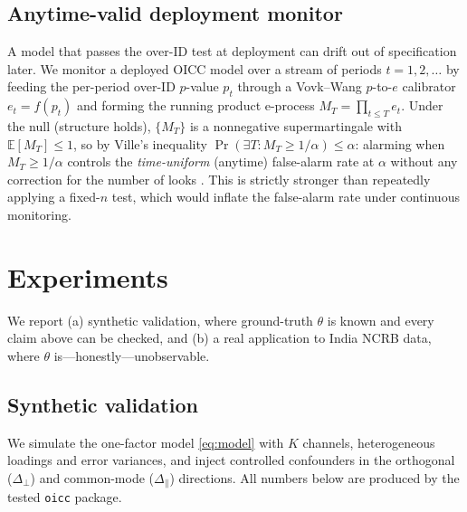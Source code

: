 \documentclass[11pt]{article}
\theoremstyle{definition}
\theoremstyle{remark}
\newcommand{\E}{\mathbb{E}}
\newcommand{\dperp}{\Delta_{\perp}}
\newcommand{\dpar}{\Delta_{\parallel}}
\begin{document}
\subsection{Anytime-valid deployment monitor}\label{sec:monitor}

A model that passes the over-ID test at deployment can drift out of
specification later. We monitor a deployed OICC model over a stream of periods
$t=1,2,\dots$ by feeding the per-period over-ID $p$-value $p_t$ through a
Vovk--Wang $p$-to-$e$ calibrator $e_t = f(p_t)$ and forming the running product
e-process $M_T = \prod_{t\le T} e_t$. Under the null (structure holds), $\{M_T\}$
is a nonnegative supermartingale with $\E[M_T]\le 1$, so by Ville's inequality
$\Pr(\exists T: M_T \ge 1/\alpha) \le \alpha$: alarming when $M_T \ge 1/\alpha$
controls the \emph{time-uniform} (anytime) false-alarm rate at $\alpha$ without
any correction for the number of looks \cite{ramdas2023,wsr2024,chugg2023}.
This is strictly stronger than repeatedly applying a fixed-$n$ test, which would
inflate the false-alarm rate under continuous monitoring.

\section{Experiments}\label{sec:experiments}

We report (a) synthetic validation, where ground-truth $\theta$ is known and
every claim above can be checked, and (b) a real application to India NCRB
data, where $\theta$ is---honestly---unobservable.

\subsection{Synthetic validation}\label{sec:synth}

We simulate the one-factor model \eqref{eq:model} with $K$ channels,
heterogeneous loadings and error variances, and inject controlled
confounders in the orthogonal ($\dperp$) and common-mode ($\dpar$)
directions. All numbers below are produced by the tested \texttt{oicc}
package.
\end{document}
